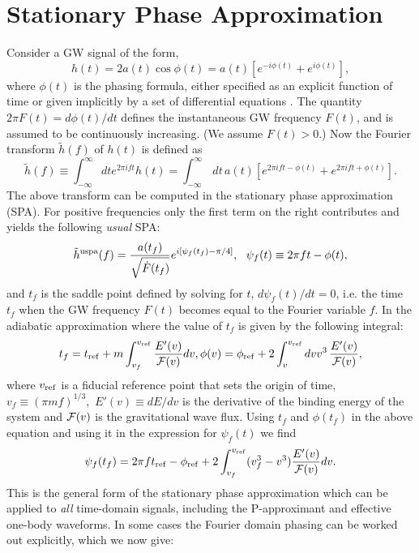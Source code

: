 \section{Stationary Phase Approximation}
Consider a GW signal of the form,
\begin {equation}
h(t)=2a(t)\cos\phi(t)= a(t) \left [ e^{-i \phi(t)} + e^{i \phi(t)} \right ],
\end {equation}
where $\phi(t)$ is the phasing formula, either specified as an explicit
function of time or given implicitly by a set of differential equations
\cite{dis3}.  The quantity $2\pi F(t) = {d\phi(t)}/{dt}$ defines the instantaneous
GW frequency $F(t)$, and is assumed to be
continuously increasing. (We assume $F(t)>0$.)
 Now the Fourier transform $\tilde h(f)$ of $h(t)$ is defined as
\begin {equation}
\tilde{h}(f) \equiv \int_{-\infty}^{\infty} dt e^{2\pi ift} h(t)
            = \int_{-\infty}^{\infty}\,dt\, a(t)
              \left[ e^{2\pi i f t - \phi(t)}  +  e^{2\pi ift +\phi(t)}\right ].
\end {equation}
The above transform can be computed in the stationary
phase approximation (SPA). For positive frequencies only the first term
on the right  contributes and yields the following {\it usual} SPA:
\begin {equation}
\tilde{h}^{\rm uspa}(f)= \frac {a(t_f)} {\sqrt {\dot{F}(t_f)}}
e^{ i\left[ \psi_f(t_f) -\pi/4\right]},\ \
\psi_f(t) \equiv  2 \pi f t -\phi(t),
\label{eq:inspiralspa1}
\end {equation}
and $t_f$ is the saddle point defined by solving for $t$, $ d \psi_f(t)/d t = 0$,
i.e. the time $t_f$ when the GW frequency $F(t)$ becomes equal to the
Fourier variable $f$. In the adiabatic approximation where
the value of $t_f$ is given by the following integral:
\begin{equation}
t_f = t_{\rm ref} + m \int_{v_f}^{v_{\rm ref}} \frac{E'(v)}{{\cal F}(v)} dv,
\phi (v) = \phi_{\rm ref} + 2 \int_v^{v_{\rm ref}} dv v^3 \, \frac{E'(v)}{{\cal F}(v)},
\label{eq:InspiralTimeAndPhaseFuncs}
\end{equation}
where $v_{\rm ref}$ is a fiducial reference point that sets the origin of
time, $v_f \equiv (\pi m f)^{1/3},$ $E'(v)\equiv dE/dv$ is the derivative of
the binding energy of the system and ${\cal F}(v)$ is the gravitational wave
flux.
Using $t_f$ and $\phi(t_f)$ in the above equation and
using it in the expression for $\psi_f(t)$ we find
\begin{equation}
 \psi_f(t_f) = 2 \pi f t_{\rm ref} - \phi_{\rm ref} + 2\int_{v_f}^{v_{\rm ref}}
(v_f^3 - v^3)
\frac{E'(v)}{{\cal {\cal F}}(v)} dv .
\label{eq:InspiralFourierPhase}
\end{equation}
This is the general form of the stationary phase approximation which
can be applied to {\it all} time-domain signals, including the P-approximant
and effective one-body waveforms. In some cases the Fourier domain phasing
can be worked out explicitly, which we now give:

